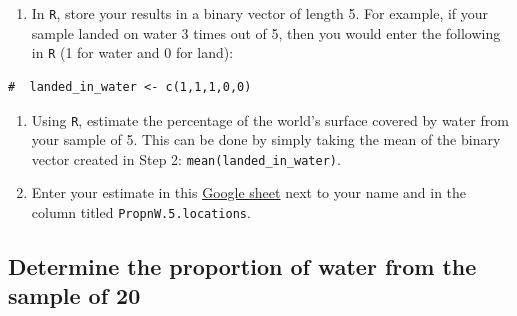 \documentclass[letterpaper,12pt,twoside,]{pinp}
\providecommand{\tightlist}{%
  \setlength{\itemsep}{0pt}\setlength{\parskip}{0pt}}
\begin{document}
\begin{enumerate}
\def\labelenumi{\arabic{enumi}.}
\setcounter{enumi}{1}
\tightlist
\item
  In \texttt{R}, store your results in a binary vector of length 5. For
  example, if your sample landed on water 3 times out of 5, then you
  would enter the following in \texttt{R} (1 for water and 0 for land):
\end{enumerate}

\begin{Shaded}
\begin{Highlighting}[]
\NormalTok{(}\NormalTok{(}\NormalTok{, }\NormalTok{,}
                \NormalTok{(}\NormalTok{(}\NormalTok{,}\NormalTok{,}\NormalTok{,}\NormalTok{,}\NormalTok{),}
                       \NormalTok{),}\NormalTok{, }\NormalTok{ ))}
\end{Highlighting}
\end{Shaded}

\begin{ShadedResult}
\begin{verbatim}
#  landed_in_water <- c(1,1,1,0,0)
\end{verbatim}
\end{ShadedResult}

\begin{enumerate}
\def\labelenumi{\arabic{enumi}.}
\setcounter{enumi}{2}
\item
  Using \texttt{R}, estimate the percentage of the world's surface
  covered by water from your sample of 5. This can be done by simply
  taking the mean of the binary vector created in Step 2:
  \texttt{mean(landed\_in\_water)}.
\item
  Enter your estimate in this
  \href{https://docs.google.com/spreadsheets/d/1Mnxeq9nQcTdQycZ7S_62fYFiNC5_a3fibsyodzfwO58/edit?usp=sharing}{Google
  sheet} next to your name and in the column titled
  \texttt{PropnW.5.locations}.
\end{enumerate}

\hypertarget{determine-the-proportion-of-water-from-the-sample-of-20}{%
\subsection{Determine the proportion of water from the sample of
20}\label{determine-the-proportion-of-water-from-the-sample-of-20}}
\end{document}
